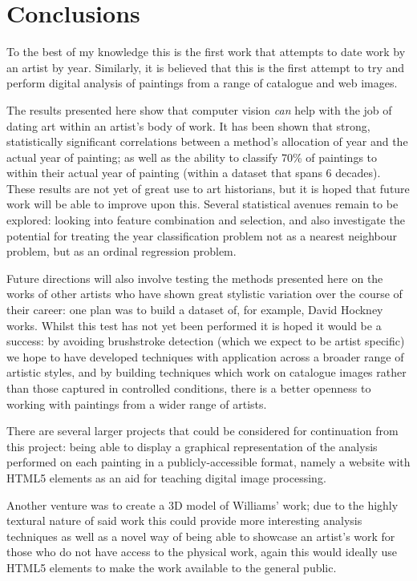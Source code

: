 \chapter{Conclusions}
To the best of my knowledge this is the first work that attempts to date work by an artist by 
year. Similarly, it is believed that this is the first attempt to try and perform digital analysis
of paintings from a range of catalogue and web images.

The results presented here show that computer vision \emph{can} help with the job of dating art 
within an artist's body of work. It has been shown that strong, statistically significant 
correlations between a method's allocation of year and the actual year of painting; as well as the
ability to classify 70\% of paintings to within their actual year of painting (within a dataset 
that spans 6 decades). These results are not yet of great use to art historians, but it is hoped 
that future work will be able to improve upon this. Several statistical avenues remain to be 
explored: looking into feature combination and selection, and also investigate the potential for 
treating the year classification problem not as a nearest neighbour problem, but as an ordinal 
regression problem. 

Future directions will also involve testing the methods presented here on the works of other 
artists who have shown great stylistic variation over the course of their career: one plan was to 
build a dataset of, for example, David Hockney works.  Whilst this test has not yet been performed
it is hoped it would be a success: by avoiding brushstroke detection (which we expect to be artist
specific) we hope to have developed techniques with application across a broader range of artistic
styles, and by building techniques which work on catalogue images rather than those captured in 
controlled conditions, there is a better openness to working with paintings from a wider range of 
artists.


There are several larger projects that could be considered for continuation from this project: 
being able to display a graphical representation of the analysis performed on each painting in a
publicly-accessible format, namely a website with HTML5 elements as an aid for teaching digital 
image processing.

Another venture was to create a 3D model of Williams' work; due to the highly textural nature of
said work this could provide more interesting analysis techniques as well as a novel way of being
able to showcase an artist's work for those who do not have access to the physical work, again
this would ideally use HTML5 elements to make the work available to the general public.

